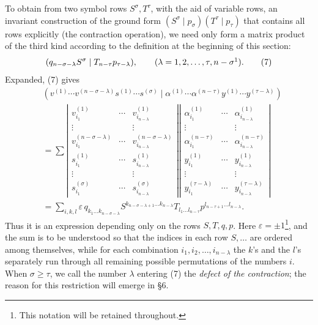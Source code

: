 \documentclass[10pt]{article}
\newcommand{\pair}[2]{(#1\mid #2)}
\newcommand{\eps}{\varepsilon}
\begin{document}
To obtain from two symbol rows $S^\sigma,T^\tau$, with the aid of variable rows, an invariant construction of the ground form $(S^\sigma\mid p_\sigma)(T^\tau\mid p_\tau)$ that contains all rows explicitly (the contraction operation), we need only form a matrix product of the third kind according to the definition at the beginning of this section:
\begin{equation}
 \pair{q_{n-\sigma-\lambda}S^\sigma}{T_{n-\tau}p_{\tau-\lambda}},
 \qquad (\lambda=1,2,\ldots,\tau,n-\sigma\footnotemark).
\tag{7}
\end{equation}
Expanded, (7) gives
\begingroup\setlength{\arraycolsep}{2pt}
\begin{equation}
\begin{aligned}
&\pair{v^{(1)}\cdots v^{(n-\sigma-\lambda)}s^{(1)}\cdots s^{(\sigma)}}
       {\alpha^{(1)}\cdots\alpha^{(n-\tau)}y^{(1)}\cdots y^{(\tau-\lambda)}} \\
&=\sum
\left|\begin{array}{ccc}
 v_{i_1}^{(1)}&\cdots&v_{i_{n-\lambda}}^{(1)}\\ \vdots&&\vdots\\
 v_{i_1}^{(n-\sigma-\lambda)}&\cdots&v_{i_{n-\lambda}}^{(n-\sigma-\lambda)}\\
 s_{i_1}^{(1)}&\cdots&s_{i_{n-\lambda}}^{(1)}\\ \vdots&&\vdots\\
 s_{i_1}^{(\sigma)}&\cdots&s_{i_{n-\lambda}}^{(\sigma)}
\end{array}\right|
\left|\begin{array}{ccc}
 \alpha_{i_1}^{(1)}&\cdots&\alpha_{i_{n-\lambda}}^{(1)}\\ \vdots&&\vdots\\
 \alpha_{i_1}^{(n-\tau)}&\cdots&\alpha_{i_{n-\lambda}}^{(n-\tau)}\\
 y_{i_1}^{(1)}&\cdots&y_{i_{n-\lambda}}^{(1)}\\ \vdots&&\vdots\\
 y_{i_1}^{(\tau-\lambda)}&\cdots&y_{i_{n-\lambda}}^{(\tau-\lambda)}
\end{array}\right|\\
&=\sum_{i,k,l}\eps\,q_{k_1\ldots k_{n-\sigma-\lambda}}
 S^{k_{n-\sigma-\lambda+1}\ldots k_{n-\lambda}}
 T_{l_1\ldots l_{n-\tau}}p^{l_{n-\tau+1}\ldots l_{n-\lambda}}.
\end{aligned}
\tag{8}
\end{equation}
\endgroup
Thus it is an expression depending only on the rows $S,T,q,p$. Here $\eps=\pm1$\footnote{This notation will be retained throughout.}, and the sum is to be understood so that the indices in each row $S,\ldots$ are ordered among themselves, while for each combination $i_1,i_2,\ldots,i_{n-\lambda}$ the $k$'s and the $l$'s separately run through all remaining possible permutations of the numbers $i$. When $\sigma\geq\tau$, we call the number $\lambda$ entering (7) the \emph{defect of the contraction}; the reason for this restriction will emerge in \S6.
\end{document}
